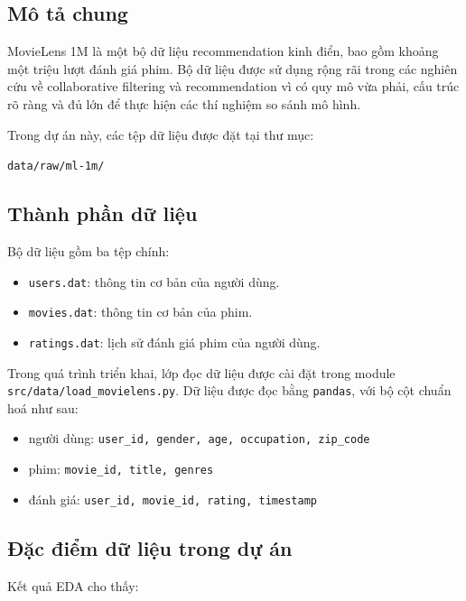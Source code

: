 \documentclass[12pt,a4paper]{article}
\begin{document}
\subsection{Mô tả chung}

MovieLens 1M là một bộ dữ liệu recommendation kinh điển, bao gồm khoảng một triệu lượt đánh giá phim. Bộ dữ liệu được sử dụng rộng rãi trong các nghiên cứu về collaborative filtering và recommendation vì có quy mô vừa phải, cấu trúc rõ ràng và đủ lớn để thực hiện các thí nghiệm so sánh mô hình.

Trong dự án này, các tệp dữ liệu được đặt tại thư mục:

\begin{center}
\texttt{data/raw/ml-1m/}
\end{center}

\subsection{Thành phần dữ liệu}

Bộ dữ liệu gồm ba tệp chính:

\begin{itemize}[leftmargin=1.5cm]
    \item \texttt{users.dat}: thông tin cơ bản của người dùng.
    \item \texttt{movies.dat}: thông tin cơ bản của phim.
    \item \texttt{ratings.dat}: lịch sử đánh giá phim của người dùng.
\end{itemize}

Trong quá trình triển khai, lớp đọc dữ liệu được cài đặt trong module \texttt{src/data/load\_movielens.py}. Dữ liệu được đọc bằng \texttt{pandas}, với bộ cột chuẩn hoá như sau:

\begin{itemize}[leftmargin=1.5cm]
    \item người dùng: \texttt{user\_id, gender, age, occupation, zip\_code}
    \item phim: \texttt{movie\_id, title, genres}
    \item đánh giá: \texttt{user\_id, movie\_id, rating, timestamp}
\end{itemize}

\subsection{Đặc điểm dữ liệu trong dự án}

Kết quả EDA cho thấy:
\end{document}
